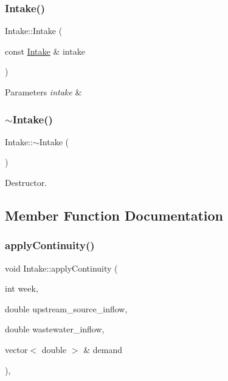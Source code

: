 \mbox{\label{classIntake_aa81e2e35940482717fa67c33b6acd002_aa81e2e35940482717fa67c33b6acd002}} 
\subsubsection{\texorpdfstring{Intake()}{Intake()}\hspace{0.1cm}{\footnotesize\ttfamily [3/3]}}
{\footnotesize\ttfamily Intake\+::\+Intake (\begin{DoxyParamCaption}\item[{const \mbox{\hyperlink{classIntake}{Intake}} \&}]{intake }\end{DoxyParamCaption})}


\begin{DoxyParams}{Parameters}
{\em intake} & \\
\hline
\end{DoxyParams}
\mbox{\label{classIntake_abf57ff6edf55f292921fb7838059ad26_abf57ff6edf55f292921fb7838059ad26}} 
\subsubsection{\texorpdfstring{$\sim$\+Intake()}{~Intake()}}
{\footnotesize\ttfamily Intake\+::$\sim$\+Intake (\begin{DoxyParamCaption}{ }\end{DoxyParamCaption})\hspace{0.3cm}{\ttfamily [override]}}

Destructor. 

\subsection{Member Function Documentation}
\mbox{\label{classIntake_acd5ab74c4091b286e69ecdcc495d83ce_acd5ab74c4091b286e69ecdcc495d83ce}} 
\subsubsection{\texorpdfstring{apply\+Continuity()}{applyContinuity()}}
{\footnotesize\ttfamily void Intake\+::apply\+Continuity (\begin{DoxyParamCaption}\item[{int}]{week,  }\item[{double}]{upstream\+\_\+source\+\_\+inflow,  }\item[{double}]{wastewater\+\_\+inflow,  }\item[{vector$<$ double $>$ \&}]{demand }\end{DoxyParamCaption})\hspace{0.3cm}{\ttfamily [override]}, {\ttfamily [virtual]}}

